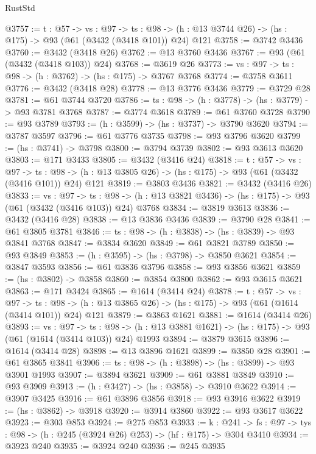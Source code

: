 \begin{lexlean}{RustStd}
\begin{coremodule}
@3757 := {t : @57} ->
  {vs : @97} ->
  {ts : @98} -> (h : @13 @3744 @26) -> (hs : @175) -> @93 (@61 (@3432 (@3418 @101)) @24) @121
@3758 := @3742 @3436
@3760 := @3432 (@3418 @26)
@3762 := @13 @3760 @3436
@3767 := @93 (@61 (@3432 (@3418 @103)) @24)
@3768 := @3619 @26
@3773 := {vs : @97} -> {ts : @98} -> (h : @3762) -> (hs : @175) -> @3767 @3768
@3774 := @3758 @3611
@3776 := @3432 (@3418 @28)
@3778 := @13 @3776 @3436
@3779 := @3729 @28
@3781 := @61 @3744 @3720
@3786 := {ts : @98} -> (h : @3778) -> (hs : @3779) -> @93 @3781 @3768
@3787 := @3774 @3618
@3789 := @61 @3760 @3728
@3790 := @93 @3789
@3793 := (h : @3599) -> (hs : @3737) -> @3790 @3620
@3794 := @3787 @3597
@3796 := @61 @3776 @3735
@3798 := @93 @3796 @3620
@3799 := (hs : @3741) -> @3798
@3800 := @3794 @3739
@3802 := @93 @3613 @3620
@3803 := @171 @3433
@3805 := @3432 (@3416 @24)
@3818 := {t : @57} ->
  {vs : @97} ->
  {ts : @98} -> (h : @13 @3805 @26) -> (hs : @175) -> @93 (@61 (@3432 (@3416 @101)) @24) @121
@3819 := @3803 @3436
@3821 := @3432 (@3416 @26)
@3833 := {vs : @97} ->
  {ts : @98} -> (h : @13 @3821 @3436) -> (hs : @175) -> @93 (@61 (@3432 (@3416 @103)) @24) @3768
@3834 := @3819 @3613
@3836 := @3432 (@3416 @28)
@3838 := @13 @3836 @3436
@3839 := @3790 @28
@3841 := @61 @3805 @3781
@3846 := {ts : @98} -> (h : @3838) -> (hs : @3839) -> @93 @3841 @3768
@3847 := @3834 @3620
@3849 := @61 @3821 @3789
@3850 := @93 @3849
@3853 := (h : @3595) -> (hs : @3798) -> @3850 @3621
@3854 := @3847 @3593
@3856 := @61 @3836 @3796
@3858 := @93 @3856 @3621
@3859 := (hs : @3802) -> @3858
@3860 := @3854 @3800
@3862 := @93 @3615 @3621
@3863 := @171 @3424
@3865 := @1614 (@3414 @24)
@3878 := {t : @57} ->
  {vs : @97} ->
  {ts : @98} -> (h : @13 @3865 @26) -> (hs : @175) -> @93 (@61 (@1614 (@3414 @101)) @24) @121
@3879 := @3863 @1621
@3881 := @1614 (@3414 @26)
@3893 := {vs : @97} ->
  {ts : @98} -> (h : @13 @3881 @1621) -> (hs : @175) -> @93 (@61 (@1614 (@3414 @103)) @24) @1993
@3894 := @3879 @3615
@3896 := @1614 (@3414 @28)
@3898 := @13 @3896 @1621
@3899 := @3850 @28
@3901 := @61 @3865 @3841
@3906 := {ts : @98} -> (h : @3898) -> (hs : @3899) -> @93 @3901 @1993
@3907 := @3894 @3621
@3909 := @61 @3881 @3849
@3910 := @93 @3909
@3913 := (h : @3427) -> (hs : @3858) -> @3910 @3622
@3914 := @3907 @3425
@3916 := @61 @3896 @3856
@3918 := @93 @3916 @3622
@3919 := (hs : @3862) -> @3918
@3920 := @3914 @3860
@3922 := @93 @3617 @3622
@3923 := @303 @853
@3924 := @275 @853
@3933 := {k : @241} ->
  {fs : @97} -> {tys : @98} -> (h : @245 (@3924 @26) @253) -> (hf : @175) -> @304 @3410
@3934 := @3923 @240
@3935 := @3924 @240
@3936 := @245 @3935

\end{coremodule}
\end{lexlean}
